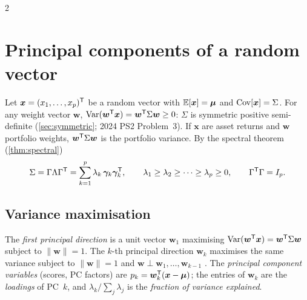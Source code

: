 \begin{paracol}{2}
\section{Principal components of a random vector}\label{ch07:sec-pop}

Let $\bm x=(x_1,\dots,x_p)^{\mathsf T}$ be a random vector with $\mathbb{E}[\bm x]=\bm\mu$ and $\operatorname{Cov}[\bm x]=\Sigma$. For any
weight vector $\bm w$, $\operatorname{Var}(\bm w^{\mathsf T}\bm x)=\bm w^{\mathsf T}\Sigma\bm w\ge0$: $\Sigma$ is symmetric positive semi-definite
(\cref{sec:symmetric}; 2024 PS2 Problem~3). If $\bm x$ are asset returns and $\bm w$ portfolio weights,
$\bm w^{\mathsf T}\Sigma\bm w$ is the portfolio variance. By the spectral theorem (\cref{thm:spectral})
\[
  \Sigma=\Gamma\Lambda\Gamma^{\mathsf T}=\sum_{k=1}^p\lambda_k\,\bm\gamma_k\bm\gamma_k^{\mathsf T},\qquad
  \lambda_1\ge\lambda_2\ge\dots\ge\lambda_p\ge0,\qquad \Gamma^{\mathsf T}\Gamma=I_p .
\]

\subsection{Variance maximisation}

\begin{definition}\label{ch07:def-pca}
The \emph{first principal direction} is a unit vector $\bm w_1$ maximising $\operatorname{Var}(\bm w^{\mathsf T}\bm x)=\bm w^{\mathsf T}\Sigma\bm w$
subject to $\|\bm w\|=1$. The $k$-th principal direction $\bm w_k$ maximises the same variance subject to
$\|\bm w\|=1$ and $\bm w\perp\bm w_1,\dots,\bm w_{k-1}$ . The \emph{principal component
variables} (scores, PC factors) are $p_k=\bm w_k^{\mathsf T}(\bm x-\bm\mu)$; the entries of $\bm w_k$ are the
\emph{loadings} of PC~$k$, and $\lambda_k/\sum_j\lambda_j$ is the \emph{fraction of variance explained}.
\end{definition}


\end{paracol}
